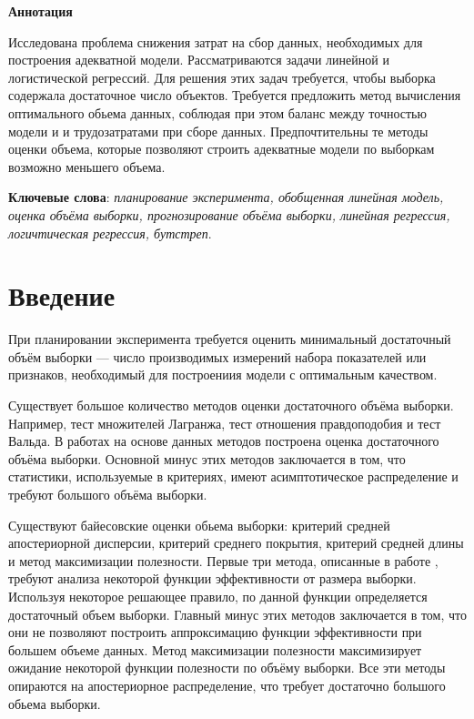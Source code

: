 \documentclass[12pt, a4paper]{scrartcl}
\theoremstyle{plain}
\theoremstyle{definition}
\begin{document}
\large\tableofcontents %
\newpage

\begin{center}
\textbf{Аннотация}
\end{center}

Исследована проблема снижения затрат на сбор данных, необходимых для построения
адекватной модели. Рассматриваются задачи линейной и логистической регрессий. Для решения этих задач требуется, чтобы выборка содержала достаточное число  объектов. Требуется предложить метод вычисления оптимального обьема данных, соблюдая при этом баланс между точностью модели и и трудозатратами при сборе данных. Предпочтительны те методы оценки объема, которые позволяют строить адекватные модели по выборкам возможно меньшего объема.

\bigskip

\textbf{Ключевые слова}: \emph {планирование эксперимента, обобщенная линейная модель, оценка объёма выборки, прогнозирование объёма выборки, линейная регрессия, логичтическая регрессия, бутстреп}.

\newpage

\section{Введение}
При планировании эксперимента требуется оценить минимальный  достаточный объём выборки --- число производимых измерений набора показателей или признаков, необходимый для построениия модели с оптимальным качеством. 

Существует большое количество методов оценки достаточного объёма выборки. Например, тест множителей Лагранжа, тест отношения правдоподобия и тест Вальда. В работах \cite{Self-Mauritsen-1998, Shieh-2000, Shieh-2005} на основе данных методов построена оценка достаточного объёма выборки. Основной минус этих методов заключается в том, что статистики, используемые в критериях, имеют асимптотическое распределение и требуют большого объёма выборки.

Существуют байесовские оценки обьема выборки: критерий средней апостериорной дисперсии, критерий среднего покрытия, критерий средней длины и метод максимизации полезности. Первые три метода, описанные в работе \cite{Wang-Gelfand-2002}, требуют анализа некоторой функции эффективности от размера выборки. Используя некоторое решающее правило, по данной функции определяется достаточный объем выборки. Главный минус этих методов заключается в том, что они не позволяют построить аппроксимацию функции эффективности при большем объеме данных. Метод максимизации полезности максимизирует ожидание некоторой функции полезности по объёму выборки. Все эти методы опираются на апостериорное распределение, что требует достаточно большого обьема выборки.
\end{document}
